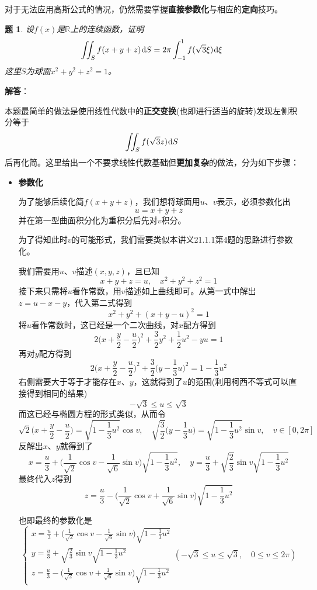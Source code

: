 \documentclass[a4paper,UTF8,fontset=windows,AutoFakeBold]{ctexart}
\newcommand*{\dr}{\hspace{0.07em}\mathrm{d}}
\newcommand*{\rb}{\mathbb{R}}
\newcommand*{\note}{\noindent *}
\theoremstyle{ex}
\newtheorem{exercise}{题}
\newcommand{\sol}[1]{{\vspace{5pt}\kaishu\noindent\textbf{解答}：\vspace{-3pt}
\begin{compactitem}
    \item[] #1
\end{compactitem}
}}
\begin{document}
\note 对于无法应用高斯公式的情况，仍然需要掌握\textbf{直接参数化}与相应的\textbf{定向}技巧。

\begin{framed}
\begin{exercise}\label{ball cont}
    设$f(x)$是$\rb$上的连续函数，证明
    $$\iint_Sf(x+y+z)\dr S=2\pi\int_{-1}^1f(\sqrt{3}\xi)\dr\xi$$
    这里$S$为球面$x^2+y^2+z^2=1$。
\end{exercise}
\sol{
    本题最简单的做法是使用线性代数中的\textbf{正交变换}(也即进行适当的旋转)发现左侧积分等于
    $$\iint_Sf(\sqrt3z)\dr S$$
    后再化简。这里给出一个不要求线性代数基础但\textbf{更加复杂}的做法，分为如下步骤：
    \begin{itemize}
        \item \textbf{参数化}
        
        为了能够后续化简$f(x+y+z)$，我们想将球面用$u$、$v$表示，必须参数化出
        $$u=x+y+z$$
        并在第一型曲面积分化为重积分后先对$v$积分。

        为了得知此时$v$的可能形式，我们需要类似本讲义21.1.1第4题的思路进行参数化。

        我们需要用$u$、$v$描述$(x,y,z)$，且已知
        $$x+y+z=u,\quad x^2+y^2+z^2=1$$
        接下来只需将$u$看作常数，用$v$描述如上曲线即可。从第一式中解出$z=u-x-y$，代入第二式得到
        $$x^2+y^2+(x+y-u)^2=1$$
        将$u$看作常数时，这已经是一个二次曲线，对$x$配方得到
        $$2\bigg(x+\frac{y}{2}-\frac{u}{2}\bigg)^2+\frac{3}{2}y^2+\frac{1}{2}u^2-yu=1$$
        再对$y$配方得到
        $$2\bigg(x+\frac{y}{2}-\frac{u}{2}\bigg)^2+\frac{3}{2}\bigg(y-\frac{1}{3}u\bigg)^2=1-\frac{1}{3}u^2$$
        右侧需要大于等于才能存在$x$、$y$，这就得到了$u$的范围(利用柯西不等式可以直接得到相同的结果)
        $$-\sqrt3\le u\le\sqrt3$$
        而这已经与椭圆方程的形式类似，从而令
        $$\sqrt{2}\bigg(x+\frac{y}{2}-\frac{u}{2}\bigg)=\sqrt{1-\frac{1}{3}u^2}\cos v,\quad\sqrt{\frac{3}{2}}\bigg(y-\frac{1}{3}u\bigg)=\sqrt{1-\frac{1}{3}u^2}\sin v,\quad v\in[0,2\pi]$$
        反解出$x$、$y$就得到了
        $$x=\frac{u}{3}+\bigg(\frac{1}{\sqrt2}\cos v-\frac{1}{\sqrt6}\sin v\bigg)\sqrt{1-\frac{1}{3}u^2},\quad y=\frac{u}{3}+\sqrt{\frac{2}{3}}\sin v\sqrt{1-\frac{1}{3}u^2}$$
        最终代入$z$得到
        $$z=\frac{u}{3}-\bigg(\frac{1}{\sqrt2}\cos v+\frac{1}{\sqrt6}\sin v\bigg)\sqrt{1-\frac{1}{3}u^2}$$

        也即最终的参数化是
        $$\begin{cases}x=\frac{u}{3}+\big(\frac{1}{\sqrt2}\cos v-\frac{1}{\sqrt6}\sin v\big)\sqrt{1-\frac{1}{3}u^2}\\y=\frac{u}{3}+\sqrt{\frac{2}{3}}\sin v\sqrt{1-\frac{1}{3}u^2}\\z=\frac{u}{3}-\big(\frac{1}{\sqrt2}\cos v+\frac{1}{\sqrt6}\sin v\big)\sqrt{1-\frac{1}{3}u^2}\end{cases}(-\sqrt3\le u\le\sqrt3,\quad 0\le v\le2\pi)$$


\end{itemize}}
\end{framed}
\end{document}
